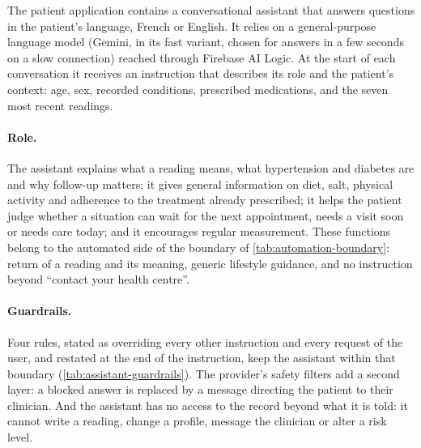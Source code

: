 The patient application contains a conversational assistant that answers questions in the patient's language, French or English. It relies on a general-purpose language model (Gemini, in its fast variant, chosen for answers in a few seconds on a slow connection) reached through Firebase AI Logic. At the start of each conversation it receives an instruction that describes its role and the patient's context: age, sex, recorded conditions, prescribed medications, and the seven most recent readings.

\paragraph{Role.} The assistant explains what a reading means, what hypertension and diabetes are and why follow-up matters; it gives general information on diet, salt, physical activity and adherence to the treatment already prescribed; it helps the patient judge whether a situation can wait for the next appointment, needs a visit soon or needs care today; and it encourages regular measurement. These functions belong to the automated side of the boundary of \cref{tab:automation-boundary}: return of a reading and its meaning, generic lifestyle guidance, and no instruction beyond ``contact your health centre''.

\paragraph{Guardrails.} Four rules, stated as overriding every other instruction and every request of the user, and restated at the end of the instruction, keep the assistant within that boundary (\cref{tab:assistant-guardrails}). The provider's safety filters add a second layer: a blocked answer is replaced by a message directing the patient to their clinician. And the assistant has no access to the record beyond what it is told: it cannot write a reading, change a profile, message the clinician or alter a risk level.

